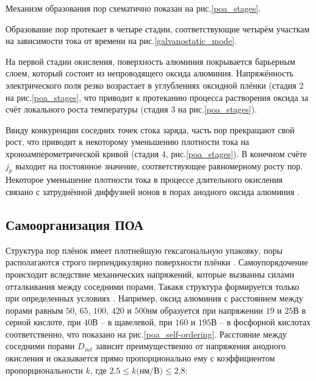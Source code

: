 Механизм образования пор схематично показан на рис.\ref{poa_stages}.

Образование пор протекает в четыре стадии, соответствующие четырём участкам на зависимости тока от времени на рис.\ref{galvanostatic_mode}.

На первой стадии окисления, поверхность алюминия покрывается барьерным слоем, который состоит из непроводящего оксида алюминия. Напряжённость электрического поля резко возрастает в углублениях оксидной плёнки (стадия 2 на рис.\ref{poa_stages}, что приводит к протеканию процесса растворения оксида за счёт локального роста температуры (стадия 3 на рис.\ref{poa_stages}).


Ввиду конкуренции соседних точек стока заряда, часть пор прекращают свой рост, что приводит к некоторому уменьшению плотности тока на хроноамперометрической кривой (стадия 4, рис.\ref{poa_stages}). В конечном счёте $j_p$ выходит на постоянное значение, соответствующее равномерному росту пор. Некоторое уменьшение плотности тока в процессе длительного окисления связано с затруднённой диффузией ионов в порах анодного оксида алюминия \cite{petukhov}.

\subsection{Самоорганизация ПОА}


Структура пор плёнок имеет плотнейшую гексагональную упаковку, поры располагаются строго перпендикулярно поверхности плёнки \cite{evertsson}. Самоупорядочение происходит вследствие механических напряжений, которые вызванны силами отталкивания между соседними порами. Такакя структура формируется только при определенных условиях \cite{napolsky-sintez}. Например, оксид алюминия с расстоянием между порами равным $50$, $65$, $100$, $420$ и $500\text{нм}$ образуется при напряжении $19$ и $25\text{В}$ в серной кислоте, при $40\text{В}$ – в щавелевой, при $160$ и $195\text{В}$ – в фосфорной кислотах соответственно, что показано на рис.\ref{poa_self-ordering}. Расстояние между соседними порами $D_{int}$ зависит преимущественно от напряжения анодного окисления и оказывается прямо пропорционально ему с коэффициентом пропорциональности $k$, где $2.5≤k\text{(нм/В)}≤2.8$:

